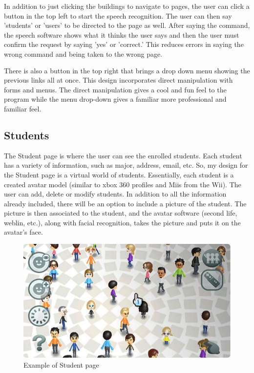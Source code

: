 \documentclass{article}
\begin{document}
In addition to just clicking the buildings to navigate to pages, the user can click a button in the top left to start the speech recognition.  The user can then say 'students' or 'users' to be directed to the page as well.  After saying the command, the speech software shows what it thinks the user says and then the user must confirm the request by saying 'yes' or 'correct.'  This reduces errors in saying the wrong command and being taken to the wrong page.

There is also a button in the top right that brings a drop down menu showing the previous links all at once.  This design incorporates direct manipulation with forms and menus.  The direct manipulation gives a cool and fun feel to the program while the menu drop-down gives a familiar more professional and familiar feel.

\subsection{Students}

The Student page is where the user can see the enrolled students.  Each student has a variety of information, such as major, address, email, etc.  So, my design for the Student page is a virtual world of students.  Essentially, each student is a created avatar model (similar to xbox 360 profiles and Miis from the Wii).  The user can add, delete or modify students.  In addition to all the information already included, there will be an option to include a picture of the student.  The picture is then associated to the student, and the avatar software (second life, weblin, etc.), along with facial recognition, takes the picture and puts it on the avatar's face.

\begin{figure}[H]
\centering
\includegraphics[width=4.5in]{Miis.jpg} 

\caption{Example of Student page}
\label{Mii}
\end{figure}
\end{document}
